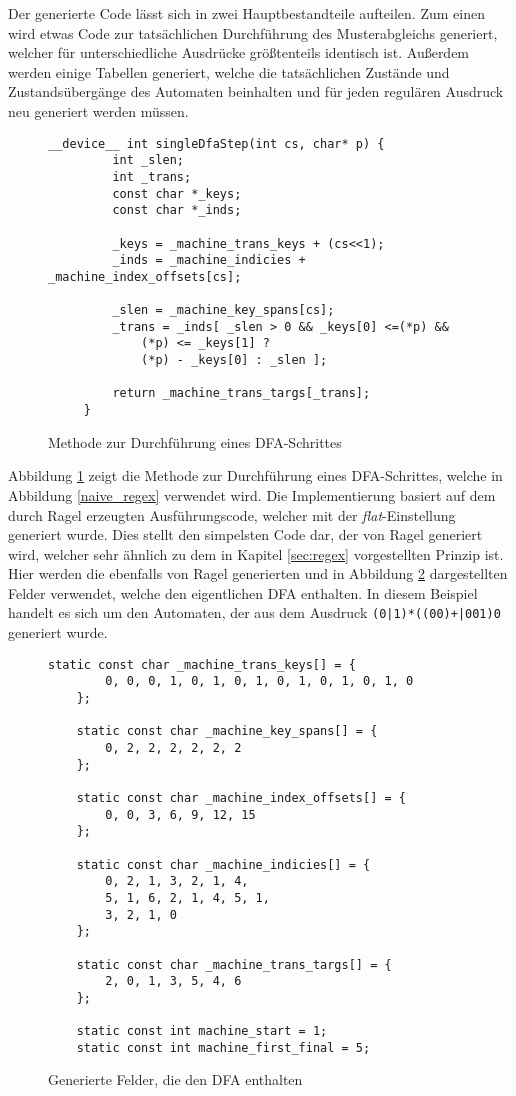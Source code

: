 Der generierte Code lässt sich in zwei Hauptbestandteile aufteilen.
Zum einen wird etwas Code zur tatsächlichen Durchführung des Musterabgleichs generiert, welcher für unterschiedliche Ausdrücke größtenteils identisch ist.
Außerdem werden einige Tabellen generiert, welche die tatsächlichen Zustände und Zustandsübergänge des Automaten beinhalten und für jeden regulären Ausdruck neu generiert werden müssen.

\begin{figure}[ht]
	 \begin{lstlisting}[language=MyC++]
	 __device__ int singleDfaStep(int cs, char* p) {
		 int _slen;
		 int _trans;
		 const char *_keys;
		 const char *_inds;
		 
		 _keys = _machine_trans_keys + (cs<<1);
		 _inds = _machine_indicies + _machine_index_offsets[cs];
		 
		 _slen = _machine_key_spans[cs];
		 _trans = _inds[ _slen > 0 && _keys[0] <=(*p) &&
			 (*p) <= _keys[1] ?
			 (*p) - _keys[0] : _slen ];
		 
		 return _machine_trans_targs[_trans];
	 }
	 \end{lstlisting}
	 \caption{Methode zur Durchführung eines DFA-Schrittes}
	 \label{naive_regex_singledfastep}
\end{figure}
 
 Abbildung \ref{naive_regex_singledfastep} zeigt die Methode zur Durchführung eines DFA-Schrittes, welche in Abbildung \ref{naive_regex} verwendet wird.
 Die Implementierung basiert auf dem durch Ragel erzeugten Ausführungscode, welcher mit der \emph{flat}-Einstellung generiert wurde.
 Dies stellt den simpelsten Code dar, der von Ragel generiert wird, welcher sehr ähnlich zu dem in Kapitel \ref{sec:regex} vorgestellten Prinzip ist.
 Hier werden die ebenfalls von Ragel generierten und in Abbildung \ref{naive_regex_felder} dargestellten Felder verwendet, welche den eigentlichen DFA enthalten.
 In diesem Beispiel handelt es sich um den Automaten, der aus dem Ausdruck \texttt{(0|1)*((00)+|001)0} generiert wurde.
 
 \begin{figure}[ht]
	 \begin{lstlisting}[language=MyC++]
	static const char _machine_trans_keys[] = {
		0, 0, 0, 1, 0, 1, 0, 1, 0, 1, 0, 1, 0, 1, 0
	};
	
	static const char _machine_key_spans[] = {
		0, 2, 2, 2, 2, 2, 2
	};
	
	static const char _machine_index_offsets[] = {
		0, 0, 3, 6, 9, 12, 15
	};
	
	static const char _machine_indicies[] = {
		0, 2, 1, 3, 2, 1, 4, 
		5, 1, 6, 2, 1, 4, 5, 1, 
		3, 2, 1, 0
	};
	
	static const char _machine_trans_targs[] = {
		2, 0, 1, 3, 5, 4, 6
	};
	
	static const int machine_start = 1;
	static const int machine_first_final = 5;
	\end{lstlisting}
	\caption{Generierte Felder, die den DFA enthalten}
	\label{naive_regex_felder}
\end{figure}
 
